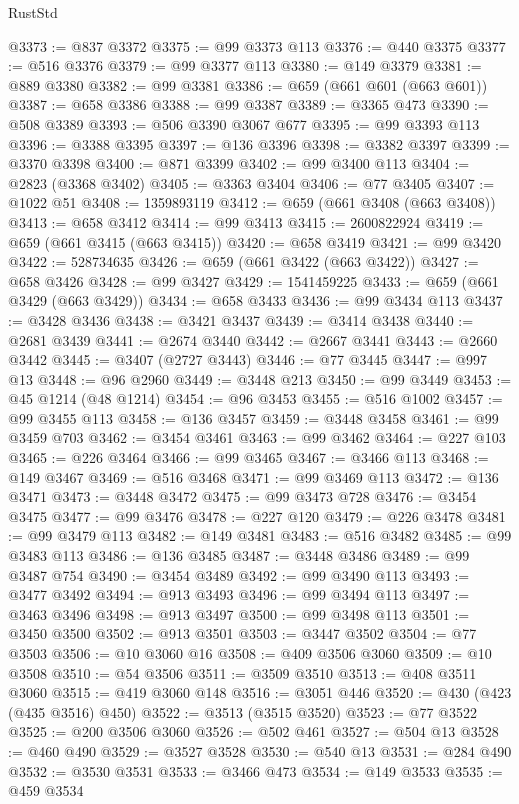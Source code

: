 \begin{lexlean}{RustStd}
\begin{coremodule}
@3373 := @837 @3372
@3375 := @99 @3373 @113
@3376 := @440 @3375
@3377 := @516 @3376
@3379 := @99 @3377 @113
@3380 := @149 @3379
@3381 := @889 @3380
@3382 := @99 @3381
@3386 := @659 (@661 @601 (@663 @601))
@3387 := @658 @3386
@3388 := @99 @3387
@3389 := @3365 @473
@3390 := @508 @3389
@3393 := @506 @3390 @3067 @677
@3395 := @99 @3393 @113
@3396 := @3388 @3395
@3397 := @136 @3396
@3398 := @3382 @3397
@3399 := @3370 @3398
@3400 := @871 @3399
@3402 := @99 @3400 @113
@3404 := @2823 (@3368 @3402)
@3405 := @3363 @3404
@3406 := @77 @3405
@3407 := @1022 @51
@3408 := 1359893119
@3412 := @659 (@661 @3408 (@663 @3408))
@3413 := @658 @3412
@3414 := @99 @3413
@3415 := 2600822924
@3419 := @659 (@661 @3415 (@663 @3415))
@3420 := @658 @3419
@3421 := @99 @3420
@3422 := 528734635
@3426 := @659 (@661 @3422 (@663 @3422))
@3427 := @658 @3426
@3428 := @99 @3427
@3429 := 1541459225
@3433 := @659 (@661 @3429 (@663 @3429))
@3434 := @658 @3433
@3436 := @99 @3434 @113
@3437 := @3428 @3436
@3438 := @3421 @3437
@3439 := @3414 @3438
@3440 := @2681 @3439
@3441 := @2674 @3440
@3442 := @2667 @3441
@3443 := @2660 @3442
@3445 := @3407 (@2727 @3443)
@3446 := @77 @3445
@3447 := @997 @13
@3448 := @96 @2960
@3449 := @3448 @213
@3450 := @99 @3449
@3453 := @45 @1214 (@48 @1214)
@3454 := @96 @3453
@3455 := @516 @1002
@3457 := @99 @3455 @113
@3458 := @136 @3457
@3459 := @3448 @3458
@3461 := @99 @3459 @703
@3462 := @3454 @3461
@3463 := @99 @3462
@3464 := @227 @103
@3465 := @226 @3464
@3466 := @99 @3465
@3467 := @3466 @113
@3468 := @149 @3467
@3469 := @516 @3468
@3471 := @99 @3469 @113
@3472 := @136 @3471
@3473 := @3448 @3472
@3475 := @99 @3473 @728
@3476 := @3454 @3475
@3477 := @99 @3476
@3478 := @227 @120
@3479 := @226 @3478
@3481 := @99 @3479 @113
@3482 := @149 @3481
@3483 := @516 @3482
@3485 := @99 @3483 @113
@3486 := @136 @3485
@3487 := @3448 @3486
@3489 := @99 @3487 @754
@3490 := @3454 @3489
@3492 := @99 @3490 @113
@3493 := @3477 @3492
@3494 := @913 @3493
@3496 := @99 @3494 @113
@3497 := @3463 @3496
@3498 := @913 @3497
@3500 := @99 @3498 @113
@3501 := @3450 @3500
@3502 := @913 @3501
@3503 := @3447 @3502
@3504 := @77 @3503
@3506 := @10 @3060 @16
@3508 := @409 @3506 @3060
@3509 := @10 @3508
@3510 := @54 @3506
@3511 := @3509 @3510
@3513 := @408 @3511 @3060
@3515 := @419 @3060 @148
@3516 := @3051 @446
@3520 := @430 (@423 (@435 @3516) @450)
@3522 := @3513 (@3515 @3520)
@3523 := @77 @3522
@3525 := @200 @3506 @3060
@3526 := @502 @461
@3527 := @504 @13
@3528 := @460 @490
@3529 := @3527 @3528
@3530 := @540 @13
@3531 := @284 @490
@3532 := @3530 @3531
@3533 := @3466 @473
@3534 := @149 @3533
@3535 := @459 @3534

\end{coremodule}
\end{lexlean}
